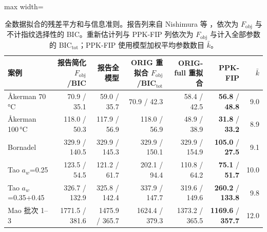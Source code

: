 \begin{table}[t]
\centering
\caption{全数据拟合的残差平方和与信息准则。报告列来自 Nishimura 等 \cite{nishimura2026}，依次为 $F_\mathrm{obj}$ 与不计指纹选择性的 BIC。重新估计列与 PPK-FIP 列依次为 $F_\mathrm{obj}$ 与计入全部参数的 BIC$_\mathrm{tot}$；PPK-FIP 使用模型加权平均参数数目 $\bar k$。}\label{tab:insample}
\footnotesize
\begin{adjustbox}{max width=\linewidth}
\begin{tabular}{lrrrrrr}
\toprule
案例 & 报告简化 $F_\mathrm{obj}$/BIC & 报告全模型 & ORIG 重拟合 $F_\mathrm{obj}$/BIC$_\mathrm{tot}$ & ORIG-full 重拟合 & PPK-FIP & $\bar k$ \\
\midrule
Åkerman 70\,°C & 70.9 / 35.1 & 59.0 / 35.7 & 70.9 / 42.3 & 58.4 / 42.5 & \textbf{56.8} / \textbf{48.8} & 9.0 \\
Åkerman 100\,°C & 118.0 / 50.3 & 117.9 / 56.9 & 118.0 / 56.9 & 48.9 / 38.9 & \textbf{31.8} / \textbf{33.2} & 8.9 \\
Bornadel & 329.9 / 140.5 & 329.9 / 145.3 & 329.9 / 150.1 & 329.9 / 154.9 & \textbf{105.0} / \textbf{27.5} & 9.1 \\
Tao $a_w$=0.25 & 123.5 / 54.5 & 121.2 / 61.7 & 202.1 / 94.4 & 110.8 / 64.2 & \textbf{75.1} / \textbf{51.7} & 10.0 \\
Tao $a_w$=0.35+0.45 & 326.7 / 132.9 & 325.8 / 142.4 & 337.9 / 147.7 & 319.6 / 149.6 & \textbf{260.2} / \textbf{133.8} & 9.8 \\
Mao 批次 1--3 & 1771.5 / 381.6 & 1475.9 / 365.7 & 1624.4 / 379.3 & 1373.2 / 365.5 & \textbf{1169.6} / \textbf{357.7} & 12.0 \\
\bottomrule
\end{tabular}
\end{adjustbox}
\end{table}
